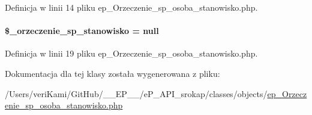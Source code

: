 Definicja w linii 14 pliku ep\-\_\-\-Orzeczenie\-\_\-sp\-\_\-osoba\-\_\-stanowisko.\-php.

\hypertarget{classep___orzeczenie__sp__osoba__stanowisko_a40db8434e34a6782c8dbb2e847a99d40}{
\paragraph[{\$\-\_\-orzeczenie\-\_\-sp\-\_\-stanowisko}]{\setlength{\rightskip}{0pt plus 5cm}\$\-\_\-orzeczenie\-\_\-sp\-\_\-stanowisko = null\hspace{0.3cm}{\ttfamily [protected]}}}\label{classep___orzeczenie__sp__osoba__stanowisko_a40db8434e34a6782c8dbb2e847a99d40}


Definicja w linii 19 pliku ep\-\_\-\-Orzeczenie\-\_\-sp\-\_\-osoba\-\_\-stanowisko.\-php.



Dokumentacja dla tej klasy została wygenerowana z pliku\-:\begin{DoxyCompactItemize}
\item 
/\-Users/veri\-Kami/\-Git\-Hub/\-\_\-\-\_\-\-E\-P\-\_\-\-\_\-/e\-P\-\_\-\-A\-P\-I\-\_\-srokap/classes/objects/\hyperlink{ep___orzeczenie__sp__osoba__stanowisko_8php}{ep\-\_\-\-Orzeczenie\-\_\-sp\-\_\-osoba\-\_\-stanowisko.\-php}\end{DoxyCompactItemize}
